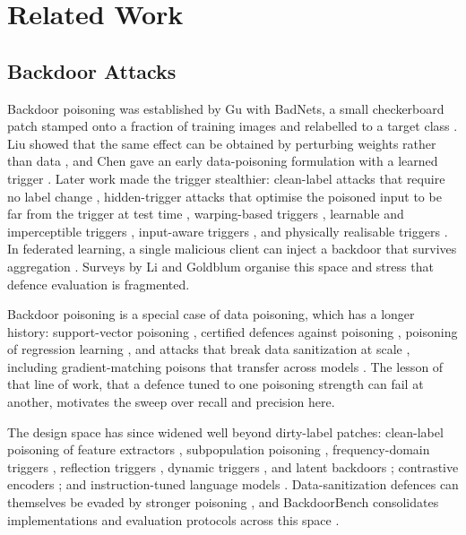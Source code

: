 \section{Related Work}
\label{sec:related}

\subsection{Backdoor Attacks}
Backdoor poisoning was established by Gu \etal{} with BadNets, a small
checkerboard patch stamped onto a fraction of training images and relabelled to a
target class \cite{badnets}. Liu \etal{} showed that the same effect can be
obtained by perturbing weights rather than data \cite{trojannn}, and Chen \etal{}
gave an early data-poisoning formulation with a learned trigger
\cite{blendattack}. Later work made the trigger stealthier: clean-label attacks
that require no label change \cite{cleanlabel}, hidden-trigger attacks that
optimise the poisoned input to be far from the trigger at test time
\cite{hidden}, warping-based triggers \cite{wanet}, learnable and imperceptible
triggers \cite{lira}, input-aware triggers \cite{inputaware}, and physically
realisable triggers \cite{physical}. In federated learning, a single malicious
client can inject a backdoor that survives aggregation
\cite{bagdasaryan,bhagoji,dba}. Surveys by Li \etal{} \cite{survey} and Goldblum
\etal{} \cite{goldblum} organise this space and stress that defence evaluation
is fragmented.

Backdoor poisoning is a special case of data poisoning, which has a longer
history: support-vector poisoning \cite{biggio}, certified defences against
poisoning \cite{steinhardt_cert}, poisoning of regression learning
\cite{jagielski}, and attacks that break data sanitization at scale
\cite{kohpoison}, including gradient-matching poisons that transfer across
models \cite{witchesbrew}. The lesson of that line of work, that a defence tuned
to one poisoning strength can fail at another, motivates the sweep over recall
and precision here.

The design space has since widened well beyond dirty-label patches: clean-label
poisoning of feature extractors \cite{poisonfrogs}, subpopulation poisoning
\cite{subpop}, frequency-domain triggers \cite{freq}, reflection triggers
\cite{reflection}, dynamic triggers \cite{dynamic}, and latent backdoors
\cite{latent}; contrastive encoders \cite{carlinicl}; and instruction-tuned
language models \cite{poisonllm}. Data-sanitization defences can themselves be
evaded by stronger poisoning \cite{kohpoison}, and BackdoorBench consolidates
implementations and evaluation protocols across this space
\cite{backdoorbench}.

